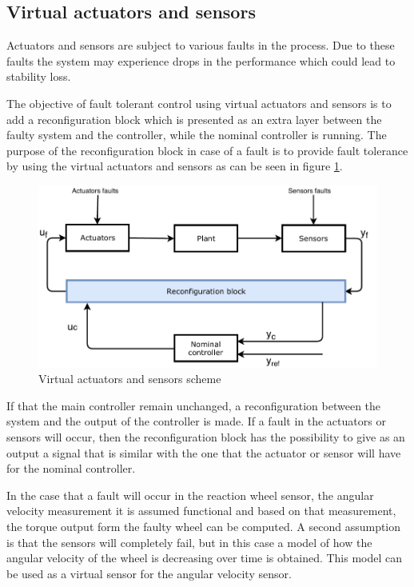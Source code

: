 \subsection{Virtual actuators and sensors} \label{chap: virtual}
Actuators and sensors are subject to various faults in the process. Due to these faults the system may experience drops in the performance which could lead to stability loss.

The objective of fault tolerant control using virtual actuators and sensors is to add a reconfiguration block which is presented as an extra layer between the faulty system and the controller, while the nominal controller is running. The purpose of the reconfiguration block in case of a fault is to provide fault tolerance by using the virtual actuators and sensors as can be seen in figure \ref{fig:VA}.

\begin{figure}[H]
	\centering
	\includegraphics[width=0.8\linewidth]{figures/VirtualActuator}
	\caption{ Virtual actuators and sensors scheme}
	\label{fig:VA}
\end{figure}

If that the main controller remain unchanged, a reconfiguration between the system and the output of the controller is made. If a fault in the actuators or sensors will occur, then the reconfiguration block has the possibility to give as an output a signal that is similar with the one that the actuator or sensor will have for the nominal controller.

In the case that a fault will occur in the reaction wheel sensor, the angular velocity measurement it is assumed functional and based on that measurement, the torque output form the faulty wheel can be computed. A second assumption is that the sensors will completely fail, but in this case a model of how the angular velocity of the wheel is decreasing over time is obtained. This model can be used as a virtual sensor for the angular velocity sensor. 
